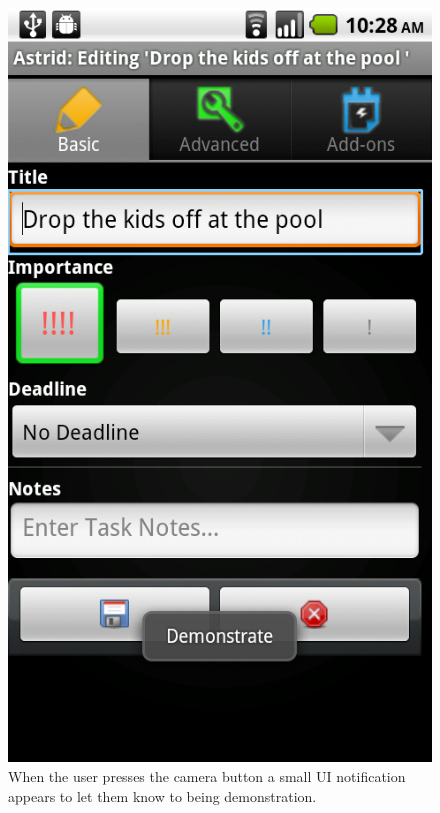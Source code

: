 \documentclass[letterpaper]{article}
\begin{document}
\begin{figure}[t]
\label{fig:interface}
\begin{center}
\includegraphics[scale=0.3]{fig/screenshot.png}
\end{center}
\caption{When the user presses the camera button a small UI notification appears to let them know to being demonstration.}
\end{figure}
\end{document}
